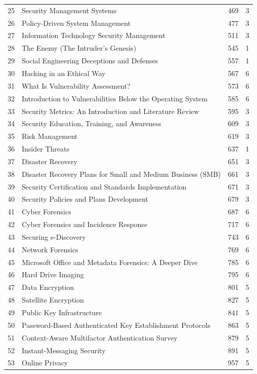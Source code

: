 \documentclass[10pt,letterpaper,oneside]{article}
\begin{document}
\begin{longtable}{@{}p{}p{}p{}p{}@{}}
25 & Security Management Systems & 469 & 3 \\
26 & Policy-Driven System Management & 477 & 3 \\
27 & Information Technology Security Management & 511 & 3 \\
28 & The Enemy (The Intruder's Genesis) & 545 & 1 \\
29 & Social Engineering Deceptions and Defenses & 557 & 1 \\
30 & Hacking in an Ethical Way & 567 & 6 \\
31 & What Is Vulnerability Assessment? & 573 & 6 \\
32 & Introduction to Vulnerabilities Below the Operating System & 585 & 6 \\
33 & Security Metrics: An Introduction and Literature Review & 595 & 3 \\
34 & Security Education, Training, and Awareness & 609 & 3 \\
35 & Risk Management & 619 & 3 \\
36 & Insider Threats & 637 & 1 \\
37 & Disaster Recovery & 651 & 3 \\
38 & Disaster Recovery Plans for Small and Medium Business (SMB) & 661 & 3 \\
39 & Security Certification and Standards Implementation & 671 & 3 \\
40 & Security Policies and Plans Development & 679 & 3 \\
41 & Cyber Forensics & 687 & 6 \\
42 & Cyber Forensics and Incidence Response & 717 & 6 \\
43 & Securing e-Discovery & 743 & 6 \\
44 & Network Forensics & 769 & 6 \\
45 & Microsoft Office and Metadata Forensics: A Deeper Dive & 785 & 6 \\
46 & Hard Drive Imaging & 795 & 6 \\
47 & Data Encryption & 801 & 5 \\
48 & Satellite Encryption & 827 & 5 \\
49 & Public Key Infrastructure & 841 & 5 \\
50 & Password-Based Authenticated Key Establishment Protocols & 863 & 5 \\
51 & Context-Aware Multifactor Authentication Survey & 879 & 5 \\
52 & Instant-Messaging Security & 891 & 5 \\
53 & Online Privacy & 957 & 5 \\

\end{longtable}
\end{document}
